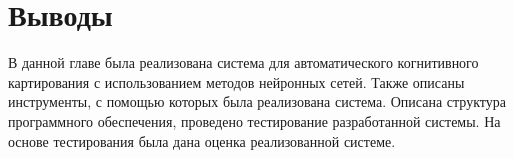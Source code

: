 \section{Выводы}

В данной главе была реализована система для автоматического когнитивного картирования с использованием
методов нейронных сетей.
Также описаны инструменты, с помощью которых была реализована система.
Описана структура программного обеспечения, проведено тестирование разработанной системы.
На основе тестирования была дана оценка реализованной системе.


